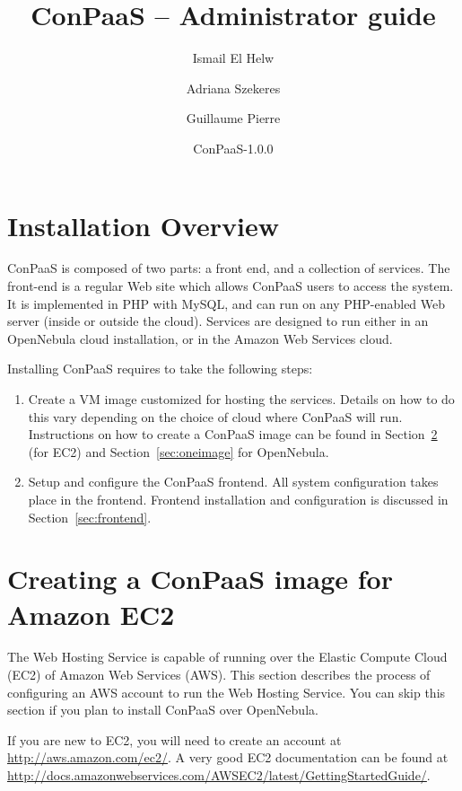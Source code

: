 \documentclass[10pt]{article}
\begin{document}
\title{ConPaaS -- Administrator guide}
\author{Ismail El Helw \and Adriana Szekeres \and Guillaume Pierre}
\date{ConPaaS-1.0.0}
\maketitle

\vfil
\tableofcontents
\vfil
\newpage

\section{Installation Overview}

ConPaaS is composed of two parts: a front end, and a collection of
services. The front-end is a regular Web site which allows ConPaaS
users to access the system. It is implemented in PHP with MySQL, and
can run on any PHP-enabled Web server (inside or outside the cloud).
Services are designed to run either in an OpenNebula cloud
installation, or in the Amazon Web Services cloud.

Installing ConPaaS requires to take the following steps:

\begin{enumerate}
\item Create a VM image customized for hosting the services. Details
  on how to do this vary depending on the choice of cloud where
  ConPaaS will run. Instructions on how to create a ConPaaS image can
  be found in Section~\ref{sec:ec2image} (for EC2) and
  Section~\ref{sec:oneimage} for OpenNebula.
\item Setup and configure the ConPaaS frontend. All system
  configuration takes place in the frontend. Frontend installation and
  configuration is discussed in Section~\ref{sec:frontend}.
\end{enumerate}

\section{Creating a ConPaaS image for Amazon EC2}
\label{sec:ec2image}

The Web Hosting Service is capable of running over the Elastic Compute
Cloud (EC2) of Amazon Web Services (AWS). This section describes the
process of configuring an AWS account to run the Web Hosting Service.
You can skip this section if you plan to install ConPaaS over
OpenNebula.

If you are new to EC2, you will need to create an account at
\url{http://aws.amazon.com/ec2/}. A very good EC2 documentation can be
found at
\url{http://docs.amazonwebservices.com/AWSEC2/latest/GettingStartedGuide/}.
\end{document}
